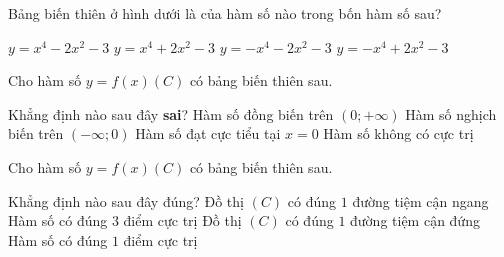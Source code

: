 \begin{ex}%
	Bảng biến thiên ở hình dưới là của hàm số nào 
	trong bốn hàm số sau?
	\begin{center}
	\end{center}
	\choice
	{\True $y=x^4-2x^2-3$}
	{$y=x^4+2x^2-3$}
	{$y=-x^4-2x^2-3$}
	{$y=-x^4+2x^2-3$}
		
\end{ex}
\begin{ex}%
	Cho hàm số $y = f(x) (C)$ có bảng biến thiên sau. 
	\begin{center}
	\end{center}
	Khẳng định nào sau đây {\bf sai}?
	\choice
	{Hàm số đồng biến trên $(0;+\infty)$}
	{Hàm số nghịch biến trên $(-\infty;0)$}
	{Hàm số đạt cực tiểu tại $x=0$}
	{\True Hàm số không có cực trị}
		
\end{ex}
\begin{ex}%
	Cho hàm số $y=f(x) (C)$ có bảng biến thiên sau. 
	\begin{center}
	\end{center}
	Khẳng định nào sau đây đúng?
	\choice
	{Đồ thị $(C)$ có đúng $1$ đường tiệm cận ngang}
	{Hàm số có đúng $3$ điểm cực trị}
	{\True Đồ thị $(C)$ có đúng $1$ đường tiệm cận đứng}
	{Hàm số có đúng $1$ điểm cực trị}
		
\end{ex}
